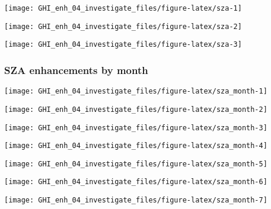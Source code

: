 \documentclass[
  10pt,
  a4paper,oneside]{article}
\begin{document}
\begin{center}\texttt{[image: GHI\_enh\_04\_investigate\_files/figure-latex/sza-1]} \end{center}

\begin{center}\texttt{[image: GHI\_enh\_04\_investigate\_files/figure-latex/sza-2]} \end{center}

\begin{center}\texttt{[image: GHI\_enh\_04\_investigate\_files/figure-latex/sza-3]} \end{center}

\newpage
\FloatBarrier

\hypertarget{sza-enhancements-by-month}{%
\subsubsection{SZA enhancements by month}\label{sza-enhancements-by-month}}

\begin{center}\texttt{[image: GHI\_enh\_04\_investigate\_files/figure-latex/sza\_month-1]} \end{center}

\begin{center}\texttt{[image: GHI\_enh\_04\_investigate\_files/figure-latex/sza\_month-2]} \end{center}

\begin{center}\texttt{[image: GHI\_enh\_04\_investigate\_files/figure-latex/sza\_month-3]} \end{center}

\begin{center}\texttt{[image: GHI\_enh\_04\_investigate\_files/figure-latex/sza\_month-4]} \end{center}

\begin{center}\texttt{[image: GHI\_enh\_04\_investigate\_files/figure-latex/sza\_month-5]} \end{center}

\begin{center}\texttt{[image: GHI\_enh\_04\_investigate\_files/figure-latex/sza\_month-6]} \end{center}

\begin{center}\texttt{[image: GHI\_enh\_04\_investigate\_files/figure-latex/sza\_month-7]} \end{center}
\end{document}
